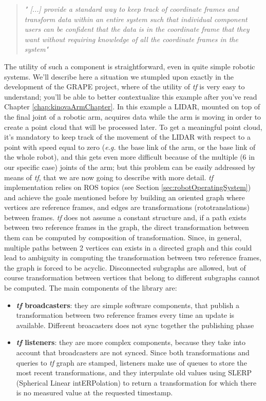 \blockquote{
\textit{" [...] provide a standard way to keep track of coordinate frames and transform data within an entire system such that individual component users can be confident that the data is in the coordinate frame that they want without requiring knowledge of all the coordinate
frames in the system" \parencite{tfPaper}}
}
The utility of such a component is straightforward, even in quite simple robotic systems. We'll describe here a situation we stumpled upon exactly in the development of the \ac{GRAPE} project, where of the utility of \textit{tf} is very easy to understand; you'll be able to better contextualize this example after you've read Chapter \ref{chap:kinovaArmChapter}. In this example a \ac{LIDAR}, mounted on top of the final joint of a robotic arm, acquires data while the arm is moving in order to create a point cloud that will be processed later. To get a meaningful point cloud, it's mandatory to keep track of the movement of the \ac{LIDAR} with respect to a point with speed equal to zero (\textit{e.g.} the base link of the arm, or the base link of the whole robot), and this gets even more difficult because of the multiple (6 in our specific case) joints of the arm; but this problem can be easily addressed by means of \textit{tf}, that we are now going to describe with more detail. 
\textit{tf} implementation relies on \ac{ROS} topics (see Section \ref{sec:robotOperatingSystem}) and achieve the goale mentioned before by building an oriented graph where vertices are reference frames, and edges are transformations (rototranslations) between frames. \textit{tf} does not assume a constant structure and, if a path exists between two reference frames in the graph, the direct transformation between them can be computed by composition of transformation. Since, in general, multiple paths between 2 vertices can exists in a directed graph and this could lead to ambiguity in computing the transformation between two reference frames, the graph is forced to be acyclic. Disconnected subgraphs are allowed, but of course transformation between vertices that belong to different subgraphs cannot be computed. 
The main components of the library are:
\begin{itemize}
	\item \textbf{\textit{tf} broadcasters}: they are simple software components, that publish a transformation between two reference frames every time an update is available. Different broacasters does not sync together the publishing phase
	\item \textbf{\textit{tf} listeners}: they are more complex components, because they take into account that broadcasters are not synced. Since both transformations and queries to \textit{tf} graph are stamped, listeners make use of queues to store the most recent transformations, and they  interpulate old values using SLERP (Spherical Linear intERPolation) to return a transformation for which there is no measured value at the requested timestamp.
\end{itemize}


